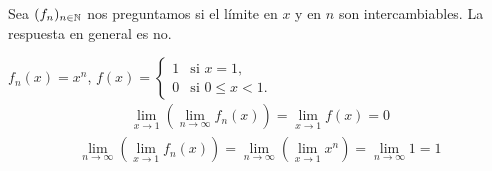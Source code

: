 \begin{note}
  Sea $(f_n)_{n \in \mathbb{N}}$ nos preguntamos si el límite en $x$ y en $n$ son intercambiables. La respuesta en general es no.
\end{note}

\clearpage

\begin{eg}
  $f_n(x) = x^n$, $f(x) = \begin{cases}
      1 & \text{si } x = 1,        \\
      0 & \text{si } 0 \leq x < 1.
    \end{cases}$ \begin{align*}
    \lim_{x \to 1} \left(\lim_{n \to \infty} f_n(x)\right) = \lim_{x \to 1} f(x) = 0
  \end{align*}
  \begin{align*}
    \lim_{n \to \infty} \left(\lim_{x \to 1} f_n(x)\right) = \lim_{n \to \infty} \left(\lim_{x \to 1} x^n\right) = \lim_{n \to \infty} 1 = 1
  \end{align*}
\end{eg}

